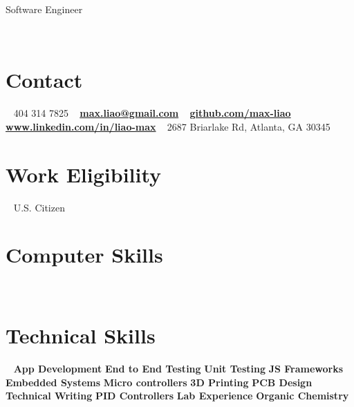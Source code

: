 \documentclass[]{resume}
\begin{document}
{Software Engineer}\\

\begin{aside}
  ~
  ~
  ~
  ~
  ~
  ~
  \section{Contact}
  ~
    404 314 7825
  ~
  \href{mailto:max.liao@gmail.com}{\textbf{max.liao@gmail.com}}
  ~
  \href{github.com/max-liao}{\textbf{github.com/max-liao}}
  ~
  \href{www.linkedin.com/in/liao-max}{\textbf{\scriptsize www.linkedin.com/in/liao-max}}
  ~
  {\small 2687 Briarlake Rd, Atlanta, GA 30345}
  ~
  \section{\large Work Eligibility}
    ~
    U.S. Citizen
    ~
  \section{\large Computer Skills}
  ~
~
\section{\large Technical Skills}
~
\textbf{App Development}
\textbf{End to End Testing}
\textbf{Unit Testing}
\textbf{JS Frameworks}
\textbf{Embedded Systems}
\textbf{Micro controllers}
\textbf{3D Printing}
\textbf{PCB Design}
\textbf{Technical Writing}
\textbf{PID Controllers}
\textbf{Lab Experience}
\textbf{Organic Chemistry}
~
\end{aside}
\end{document}
